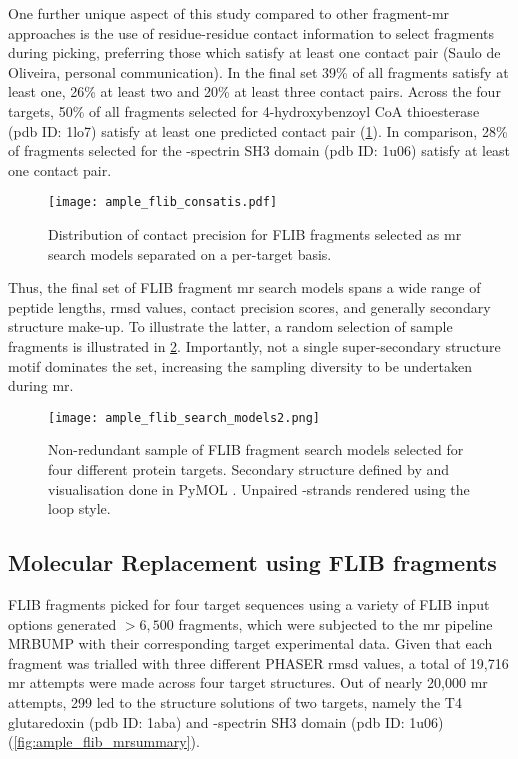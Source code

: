 One further unique aspect of this study compared to other fragment-\gls{mr} approaches is the use of residue-residue contact information to select fragments during picking, preferring those which satisfy at least one contact pair (Saulo de Oliveira, personal communication). In the final set 39\% of all fragments satisfy at least one, 26\% at least two and 20\% at least three contact pairs. Across the four targets, 50\% of all fragments selected for 4-hydroxybenzoyl CoA thioesterase (\gls{pdb} ID: 1lo7) satisfy at least one predicted contact pair (\cref{fig:ample_flib_consatis}). In comparison, 28\% of fragments selected for the \textalpha-spectrin SH3 domain (\gls{pdb} ID: 1u06) satisfy at least one contact pair.

\begin{figure}[H]
	\centering
	\texttt{[image: ample\_flib\_consatis.pdf]}
	\caption[Distribution of contact precision for FLIB fragments]{Distribution of contact precision for FLIB fragments selected as \gls{mr} search models separated on a per-target basis.}
	\label{fig:ample_flib_consatis}
\end{figure}

Thus, the final set of FLIB fragment \gls{mr} search models spans a wide range of peptide lengths, \gls{rmsd} values, contact precision scores, and generally secondary structure make-up. To illustrate the latter, a random selection of sample fragments is illustrated in \cref{fig:ample_flib_search_models}. Importantly, not a single super-secondary structure motif dominates the set, increasing the sampling diversity to be undertaken during \gls{mr}.

\begin{figure}[H]
	\centering
	\texttt{[image: ample\_flib\_search\_models2.png]}
	\caption[Fragment search models derived from FLIB]{Non-redundant sample of FLIB fragment search models selected for four different protein targets. Secondary structure defined by and visualisation done in PyMOL \cite{Schrodinger_LLC2015-jz}. Unpaired \textbeta-strands rendered using the loop style.}
	\label{fig:ample_flib_search_models}
\end{figure}

\subsection{Molecular Replacement using FLIB fragments}
FLIB fragments picked for four target sequences using a variety of FLIB input options generated $>6,500$ fragments, which were subjected to the \gls{mr} pipeline MRBUMP with their corresponding target experimental data. Given that each fragment was trialled with three different PHASER \gls{rmsd} values, a total of 19,716 \gls{mr} attempts were made across four target structures. Out of nearly 20,000 \gls{mr} attempts, 299 led to the structure solutions of two targets, namely the T4 glutaredoxin (\gls{pdb} ID: 1aba) and \textalpha-spectrin SH3 domain (\gls{pdb} ID: 1u06) (\cref{fig:ample_flib_mrsummary}).

